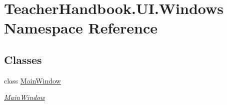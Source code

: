 \hypertarget{namespace_teacher_handbook_1_1_u_i_1_1_windows}{}\section{Teacher\+Handbook.\+U\+I.\+Windows Namespace Reference}
\label{namespace_teacher_handbook_1_1_u_i_1_1_windows}
\subsection*{Classes}
\begin{DoxyCompactItemize}
\item 
class \mbox{\hyperlink{class_teacher_handbook_1_1_u_i_1_1_windows_1_1_main_window}{Main\+Window}}
\begin{DoxyCompactList}\small\item\em \mbox{\hyperlink{class_teacher_handbook_1_1_u_i_1_1_windows_1_1_main_window}{Main\+Window}} \end{DoxyCompactList}\end{DoxyCompactItemize}
